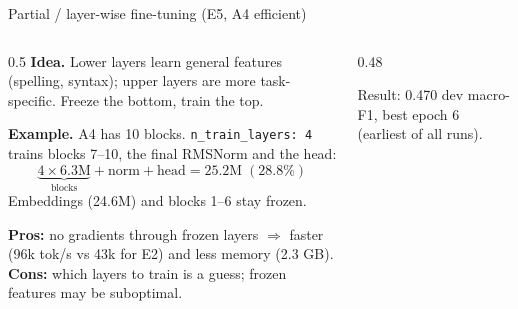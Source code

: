 \documentclass[aspectratio=169,11pt]{beamer}
\newcommand{\code}[1]{\texttt{\small #1}}
\begin{document}
\begin{frame}{Partial / layer-wise fine-tuning (E5, A4 efficient)}
  \begin{columns}[T]
    \begin{column}{0.5\textwidth}
      \footnotesize
      \textbf{Idea.} Lower layers learn general features (spelling, syntax);
      upper layers are more task-specific. Freeze the bottom, train the top.
      \vspace{1mm}

      \textbf{Example.} A4 has 10 blocks. \code{n\_train\_layers: 4} trains blocks 7--10,
      the final RMSNorm and the head:
      $$\underbrace{4 \times 6.3\text{M}}_{\text{blocks}} + \text{norm} + \text{head} = 25.2\text{M} \;(28.8\%)$$
      Embeddings (24.6M) and blocks 1--6 stay frozen.
      \vspace{1mm}

      \textbf{Pros:} no gradients through frozen layers $\Rightarrow$ faster
      (96k tok/s vs 43k for E2) and less memory (2.3 GB).\\
      \textbf{Cons:} which layers to train is a guess; frozen features may be suboptimal.
    \end{column}
    \begin{column}{0.48\textwidth}
      \footnotesize
      \begin{center}
      \end{center}
      Result: 0.470 dev macro-F1, best epoch 6 (earliest of all runs).
    \end{column}
  \end{columns}
\end{frame}
\end{document}
